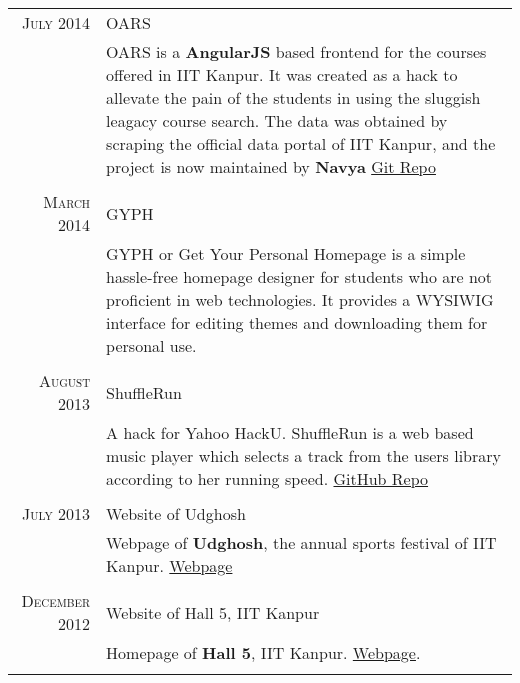 \documentclass[a4paper,10pt]{article} %
\begin{document}
\begin{tabular}{r|p{11cm}}

    \textsc{July 2014} & OARS\\
                       & \footnotesize{OARS is a \textbf{AngularJS} based frontend for the
                          courses offered in IIT Kanpur. It was created as a
                          hack to allevate the pain of the students in using the
                          sluggish leagacy course search. The data was obtained by
                          scraping the official data portal of IIT Kanpur, and the
                          project is now maintained by \textbf{Navya}
                          \href{https://github.com/navya/oars} {Git Repo} }\\
                          \\

    \textsc{March 2014} & GYPH\\
                        & \footnotesize{GYPH or Get Your Personal Homepage
                           is a simple hassle-free homepage designer for students who are not
                           proficient in web technologies. It provides a WYSIWIG
                           interface for editing themes and downloading them for personal use.} \\
                           \\

    \textsc{August 2013} & ShuffleRun\\
                         & \footnotesize{A hack for Yahoo HackU. ShuffleRun is a
                            web based music player which selects a track from the users library
                            according to her running speed.
                            \href{https://github.com/srijanshetty/ShuffleRun} {GitHub Repo} }\\
                            \\

    \textsc{July 2013} & Website of Udghosh\\
                       & \footnotesize{Webpage of \textbf{Udghosh}, the annual sports festival of
                          IIT Kanpur. \href{www.udghosh.org} {Webpage} } \\
                          \\

    \textsc{December 2012} & Website of Hall 5, IIT Kanpur\\
                           & \footnotesize{Homepage of \textbf{Hall 5}, IIT Kanpur.
                             \href{http://www.iitk.ac.in/hall5} {Webpage}. } \\
                             \\


\end{tabular}
\end{document}
